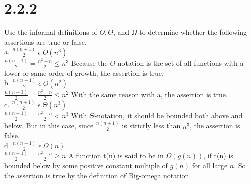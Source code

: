 \documentclass[8pt, letterpaper]{article}
\begin{document}
\section{2.2.2}
Use the informal definitions of $O, \Theta$, and $\Omega$ to determine whether the following assertions are true or false. \\
a. $\frac{n(n+1)}{2} \; \epsilon \; O(n^3)$ \\
    \indent $\frac{n(n+1)}{2} = \frac{n^2 + n}{2} \le n^3$ Because the $O$-notation is the set of all functions with a lower or same order of growth, the assertion is true.  \\
b. $\frac{n(n+1)}{2} \; \epsilon \; O(n^2)$ \\
    \indent $\frac{n(n+1)}{2} = \frac{n^2 + n}{2} \le n^2$ With the same reason with a, the assertion is true. \\
c. $\frac{n(n+1)}{2} \; \epsilon \; \Theta(n^3)$ \\
    \indent $\frac{n(n+1)}{2} = \frac{n^2 + n}{2} < n^3$ With $\Theta$-notation, it should be bounded both above and below. But in this case, since $\frac{n(n+1)}{2}$ is strictly less than $n^3$, the assertion is false. \\
d. $\frac{n(n+1)}{2} \; \epsilon \; \Omega(n)$ \\
    \indent $\frac{n(n+1)}{2} = \frac{n^2 + n}{2} \ge n$ A function t(n) is said to be in $\Omega(g(n))$, if t(n) is bounded below by some positive constant multiple of $g(n)$ for all large $n$. So the assertion is true by the definition of Big-omega notation.
    
\end{document}
